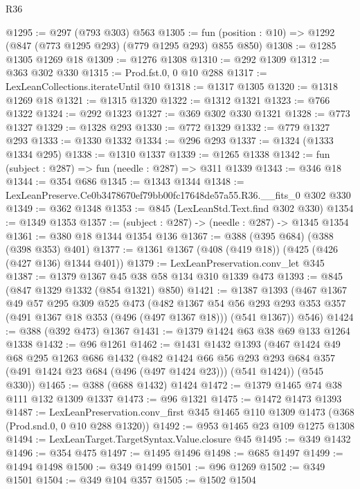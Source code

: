 \begin{lexlean}{R36}
\begin{coremodule}
@1295 := @297 (@793 @303) @563
@1305 := fun (position : @10) => @1292 (@847 (@773 @1295 @293) (@779 @1295 @293) @855 @850)
@1308 := @1285 @1305 @1269 @18
@1309 := @1276 @1308
@1310 := @292 @1309
@1312 := @363 @302 @330
@1315 := Prod.fst.{0, 0} @10 @288
@1317 := LexLeanCollections.iterateUntil @10
@1318 := @1317 @1305
@1320 := @1318 @1269 @18
@1321 := @1315 @1320
@1322 := @1312 @1321
@1323 := @766 @1322
@1324 := @292 @1323
@1327 := @369 @302 @330 @1321
@1328 := @773 @1327
@1329 := @1328 @293
@1330 := @772 @1329
@1332 := @779 @1327 @293
@1333 := @1330 @1332
@1334 := @296 @293
@1337 := @1324 (@1333 @1334 @295)
@1338 := @1310 @1337
@1339 := @1265 @1338
@1342 := fun (subject : @287) => fun (needle : @287) => @311 @1339
@1343 := @346 @18
@1344 := @354 @686
@1345 := @1343 @1344
@1348 := LexLeanPreserve.Ce0b3478670ef79bb00fc17648de57a55.R36.__fits_0 @302 @330
@1349 := @362 @1348
@1353 := @845 (LexLeanStd.Text.find @302 @330)
@1354 := @1349 @1353
@1357 := (subject : @287) -> (needle : @287) -> @1345 @1354
@1361 := @380 @18 @1344 @1354 @136
@1367 := @388 (@395 @684) (@388 (@398 @353) @401)
@1377 := @1361 @1367 (@408 (@419 @18)) (@425 (@426 (@427 @136) @1344 @401))
@1379 := LexLeanPreservation.conv_let @345
@1387 := @1379 @1367 @45 @38 @58 @134 @310 @1339 @473
@1393 := @845 (@847 @1329 @1332 (@854 @1321) @850)
@1421 := @1387
    @1393
    (@467
      @1367
      @49
      @57
      @295
      @309
      @525
      @473
      (@482
        @1367
        @54
        @56
        @293
        @293
        @353
        @357
        (@491 @1367 @18 @353 (@496 (@497 @1367 @18)))
        (@541 @1367))
      @546)
@1424 := @388 (@392 @473) @1367
@1431 := @1379 @1424 @63 @38 @69 @133 @1264 @1338
@1432 := @96 @1261
@1462 := @1431
    @1432
    @1393
    (@467
      @1424
      @49
      @68
      @295
      @1263
      @686
      @1432
      (@482
        @1424
        @66
        @56
        @293
        @293
        @684
        @357
        (@491 @1424 @23 @684 (@496 (@497 @1424 @23)))
        (@541 @1424))
      (@545 @330))
@1465 := @388 (@688 @1432) @1424
@1472 := @1379 @1465 @74 @38 @111 @132 @1309 @1337
@1473 := @96 @1321
@1475 := @1472 @1473 @1393
@1487 := LexLeanPreservation.conv_first
    @345
    @1465
    @110
    @1309
    @1473
    (@368 (Prod.snd.{0, 0} @10 @288 @1320))
@1492 := @953 @1465 @23 @109 @1275 @1308
@1494 := LexLeanTarget.TargetSyntax.Value.closure @45
@1495 := @349 @1432
@1496 := @354 @475
@1497 := @1495 @1496
@1498 := @685 @1497
@1499 := @1494 @1498
@1500 := @349 @1499
@1501 := @96 @1269
@1502 := @349 @1501
@1504 := @349 @104 @357
@1505 := @1502 @1504

\end{coremodule}
\end{lexlean}
